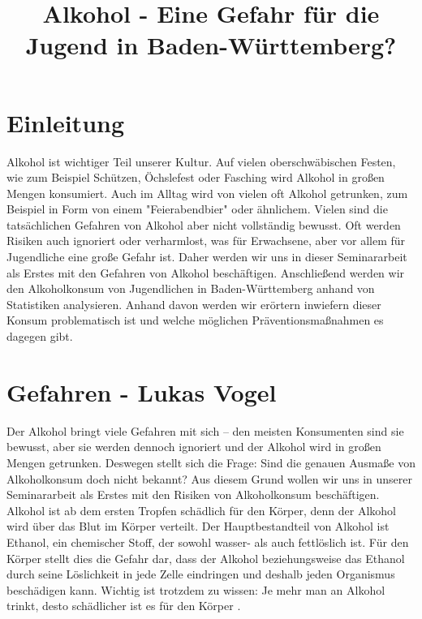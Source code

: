 \documentclass[12pt]{article}
\title{Alkohol - Eine Gefahr für die Jugend in Baden-Württemberg?}
\begin{document}


\clearpage
\tableofcontents
{}
\setcounter{page}{1}
\clearpage


\section{Einleitung}
Alkohol ist wichtiger Teil unserer Kultur. Auf vielen oberschwäbischen Festen, wie zum Beispiel Schützen, Öchslefest oder Fasching wird Alkohol in großen Mengen konsumiert. Auch im Alltag wird von vielen oft Alkohol getrunken, zum Beispiel in Form von einem "Feierabendbier" oder ähnlichem. Vielen sind die tatsächlichen Gefahren von Alkohol aber nicht vollständig bewusst. Oft werden Risiken auch ignoriert oder verharmlost, was für Erwachsene, aber vor allem für Jugendliche eine große Gefahr ist. Daher werden wir uns in dieser Seminararbeit als Erstes mit den Gefahren von Alkohol beschäftigen. Anschließend werden wir den Alkoholkonsum von Jugendlichen in Baden-Württemberg anhand von Statistiken analysieren. Anhand davon werden wir erörtern inwiefern dieser Konsum problematisch ist und welche möglichen Präventionsmaßnahmen es dagegen gibt.
\section{Gefahren \footnotesize{- Lukas Vogel}} %
Der Alkohol bringt viele Gefahren mit sich – den meisten Konsumenten sind sie bewusst, aber sie werden dennoch ignoriert und der Alkohol wird in großen Mengen getrunken. 
Deswegen stellt sich die Frage: Sind die genauen Ausmaße von Alkoholkonsum doch nicht bekannt? 
Aus diesem Grund wollen wir uns in unserer Seminararbeit als Erstes mit den Risiken von Alkoholkonsum beschäftigen.%
Alkohol ist ab dem ersten Tropfen schädlich für den Körper, denn der Alkohol wird über das Blut im Körper verteilt. Der Hauptbestandteil von Alkohol ist Ethanol, ein chemischer Stoff, der sowohl wasser- als auch fettlöslich ist. Für den Körper stellt dies die Gefahr dar, dass der Alkohol beziehungsweise das Ethanol durch seine Löslichkeit in jede Zelle eindringen und deshalb jeden Organismus beschädigen kann. Wichtig ist trotzdem zu wissen: Je mehr man an Alkohol trinkt, desto schädlicher ist es für den Körper \autocite[3]{burger_bundes-gesundheitssurvey_2003}.\\
\end{document}
